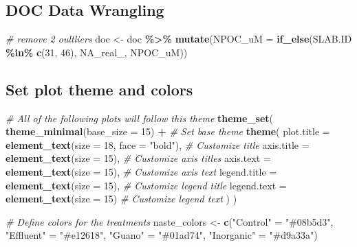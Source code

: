 \documentclass[
]{article}
\newenvironment{Shaded}{\begin{snugshade}}{\end{snugshade}}
\newcommand{\AttributeTok}[1]{\textcolor[rgb]{0.13,0.29,0.53}{#1}}
\newcommand{\CommentTok}[1]{\textcolor[rgb]{0.56,0.35,0.01}{\textit{#1}}}
\newcommand{\ConstantTok}[1]{\textcolor[rgb]{0.56,0.35,0.01}{#1}}
\newcommand{\DecValTok}[1]{\textcolor[rgb]{0.00,0.00,0.81}{#1}}
\newcommand{\FunctionTok}[1]{\textcolor[rgb]{0.13,0.29,0.53}{\textbf{#1}}}
\newcommand{\NormalTok}[1]{#1}
\newcommand{\OtherTok}[1]{\textcolor[rgb]{0.56,0.35,0.01}{#1}}
\newcommand{\SpecialCharTok}[1]{\textcolor[rgb]{0.81,0.36,0.00}{\textbf{#1}}}
\newcommand{\StringTok}[1]{\textcolor[rgb]{0.31,0.60,0.02}{#1}}
\begin{document}
\hypertarget{doc-data-wrangling}{%
\subsection{DOC Data Wrangling}\label{doc-data-wrangling}}

\begin{Shaded}
\begin{Highlighting}[]
\CommentTok{\# remove 2 oultliers}
\NormalTok{doc }\OtherTok{\textless{}{-}}\NormalTok{ doc }\SpecialCharTok{\%\textgreater{}\%}
  \FunctionTok{mutate}\NormalTok{(}\AttributeTok{NPOC\_uM =} \FunctionTok{if\_else}\NormalTok{(SLAB.ID }\SpecialCharTok{\%in\%} \FunctionTok{c}\NormalTok{(}\DecValTok{31}\NormalTok{, }\DecValTok{46}\NormalTok{), }\ConstantTok{NA\_real\_}\NormalTok{, NPOC\_uM))}
\end{Highlighting}
\end{Shaded}

\hypertarget{set-plot-theme-and-colors}{%
\subsection{Set plot theme and colors}\label{set-plot-theme-and-colors}}

\begin{Shaded}
\begin{Highlighting}[]
 \CommentTok{\# All of the following plots will follow this theme}
\FunctionTok{theme\_set}\NormalTok{(}
  \FunctionTok{theme\_minimal}\NormalTok{(}\AttributeTok{base\_size =} \DecValTok{15}\NormalTok{) }\SpecialCharTok{+}                             \CommentTok{\# Set base theme}
    \FunctionTok{theme}\NormalTok{(}
      \AttributeTok{plot.title =} \FunctionTok{element\_text}\NormalTok{(}\AttributeTok{size =} \DecValTok{18}\NormalTok{, }\AttributeTok{face =} \StringTok{"bold"}\NormalTok{),    }\CommentTok{\# Customize title}
      \AttributeTok{axis.title =} \FunctionTok{element\_text}\NormalTok{(}\AttributeTok{size =} \DecValTok{15}\NormalTok{),                   }\CommentTok{\# Customize axis titles}
      \AttributeTok{axis.text =} \FunctionTok{element\_text}\NormalTok{(}\AttributeTok{size =} \DecValTok{15}\NormalTok{),                    }\CommentTok{\# Customize axis text}
      \AttributeTok{legend.title =} \FunctionTok{element\_text}\NormalTok{(}\AttributeTok{size =} \DecValTok{15}\NormalTok{),                 }\CommentTok{\# Customize legend title}
      \AttributeTok{legend.text =} \FunctionTok{element\_text}\NormalTok{(}\AttributeTok{size =} \DecValTok{15}\NormalTok{)                  }\CommentTok{\# Customize legend text}
\NormalTok{    )}
\NormalTok{)}


\CommentTok{\# Define colors for the treatments}
\NormalTok{naste\_colors }\OtherTok{\textless{}{-}} \FunctionTok{c}\NormalTok{(}\StringTok{"Control"} \OtherTok{=} \StringTok{"\#08b5d3"}\NormalTok{,  }
               \StringTok{"Effluent"} \OtherTok{=} \StringTok{"\#e12618"}\NormalTok{,   }
               \StringTok{"Guano"} \OtherTok{=} \StringTok{"\#01ad74"}\NormalTok{,   }
               \StringTok{"Inorganic"} \OtherTok{=} \StringTok{"\#d9a33a"}\NormalTok{)  }
\end{Highlighting}
\end{Shaded}
\end{document}
